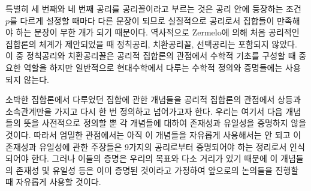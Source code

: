 \documentclass{../../large}
\begin{document}
특별히 세 번째와 네 번째 공리를 공리꼴이라고 부르는 것은 공리 안에 등장하는 조건 $p$를 다르게 설정할 때마다 다른 문장이 되므로 실질적으로 공리로서 집합들이 만족해야 하는 문장이 무한 개가 되기 때문이다.
역사적으로 Zermelo에 의해 처음 공리적인 집합론의 체계가 제안되었을 때 정칙공리, 치환공리꼴, 선택공리는 포함되지 않았다.
이 중 정칙공리와 치환공리꼴은 공리적 집합론의 관점에서 수학적 기초를 구성할 때 중요한 역할을 하지만 일반적으로 현대수학에서 다루는 수학적 정의와 증명들에는 사용되지 않는다.

소박한 집합론에서 다루었던 집합에 관한 개념들을 공리적 집합론의 관점에서 상등과 소속관계만을 가지고 다시 한 번 정의하고 넘어가고자 한다.
우리는 여기서 다음 개념들의 뜻을 사전적으로 정의할 뿐 각 개념들에 대하여 존재성과 유일성을 증명하지 않을 것이다.
따라서 엄밀한 관점에서는 아직 이 개념들을 자유롭게 사용해서는 안 되고 이 존재성과 유일성에 관한 주장들은 9가지의 공리로부터 증명되어야 하는 정리로서 인식되어야 한다.
그러나 이들의 증명은 우리의 목표와 다소 거리가 있기 때문에 이 개념들의 존재성 및 유일성 등은 이미 증명된 것이라고 가정하여 앞으로의 논의들을 진행할 때 자유롭게 사용할 것이다.
\end{document}
